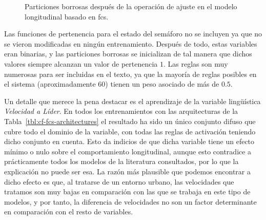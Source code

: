 \begin{figure}
	\centering
	\qquad
	\qquad
	\qquad
	\caption[Particiones borrosas después de la operación de ajuste en el modelo longitudinal basado en \acrshort{fcs}]{Particiones borrosas después de la operación de ajuste en el modelo longitudinal basado en \acrshort{fcs}.}
	\label{fig:adjusted-fuzzy-partitions}
\end{figure}

Las funciones de pertenencia para el estado del semáforo no se incluyen ya que no se vieron modificadas en ningún entrenamiento. Después de todo, estas variables eran binarias, y las particiones borrosas se inicializan de tal manera que dichos valores siempre alcanzan un valor de pertenencia $1$. Las reglas son muy numerosas para ser incluidas en el texto, ya que la mayoría de reglas posibles en el sistema (aproximadamente $60$) tienen un peso asociado de más de $0.5$.

Un detalle que merece la pena destacar es el aprendizaje de la variable lingüística \textit{Velocidad a Líder}. En todos los entrenamientos con las arquitecturas de la Tabla~\ref{tbl:cf-fcs-architectures} el resultado ha sido un único conjunto difuso que cubre todo el dominio de la variable, con todas las reglas de activación teniendo dicho conjunto en cuenta. Esto da indicios de que dicha variable tiene un efecto mínimo o nulo sobre el comportamiento longitudinal, aunque esto contradice a prácticamente todos los modelos de la literatura consultados, por lo que la explicación no puede ser esa. La razón más plausible que podemos encontrar a dicho efecto es que, al tratarse de un entorno urbano, las velocidades que tratamos son muy bajas en comparación con las que se trabaja en este tipo de modelos, y por tanto, la diferencia de velocidades no son un factor determinante en comparación con el resto de variables.

